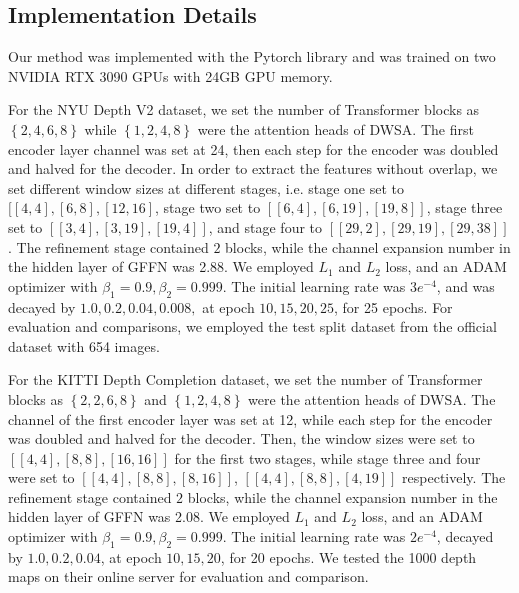 \documentclass[conference]{IEEEtran}
\begin{document}
\subsection{Implementation Details}
Our method was implemented with the Pytorch library and was trained on two NVIDIA RTX 3090 GPUs with 24GB GPU memory.

For the NYU Depth V2 dataset, we set the number of Transformer blocks as $\left\{ 2,4,6,8 \right\}$ while $\left\{ 1,2,4,8 \right\}$ were the attention heads of DWSA. The first encoder layer channel was set at 24, then each step for the encoder was doubled and halved for the decoder. In order to extract the features without overlap, we set different window sizes at different stages, i.e. stage one set to $[[4,4],[6,8],[12,16]$, stage two set to $[[6,4],[6,19],[19,8]]$, stage three set to $[[3,4],[3,19],[19,4]]$, and stage four to $[[29,2],[29,19],[29,38]]$. The refinement stage contained $2$ blocks, while the channel expansion number in the hidden layer of GFFN was 2.88. We employed  $L_1$ and $L_2$ loss, and an ADAM optimizer with $\beta_1 = 0.9,  \beta_2 = 0.999$. The initial learning rate was $3e^{- 4}$, and was decayed by ${1.0,0.2,0.04,0.008,}$ at epoch ${10,15,20,25}$, for 25 epochs. For evaluation and comparisons, we employed the test split dataset from the official dataset with 654 images.

For the KITTI Depth Completion dataset, we set the number of Transformer blocks as $\left\{ 2,2,6,8 \right\}$ and $\left\{ 1,2,4,8 \right\}$ were the attention heads of DWSA. The channel of the first encoder layer was set at 12, while each step for the encoder was doubled and halved for the decoder. Then, the window sizes were set to $[[4,4],[8,8],[16,16]]$ for the first two stages, while stage three and four were set to $[[4,4],[8,8],[8,16]]$, $[[4,4],[8,8],[4,19]]$ respectively. The refinement stage contained $2$ blocks, while the channel expansion number in the hidden layer of GFFN was 2.08. We employed  $L_1$ and $L_2$ loss, and an ADAM optimizer with $\beta_1 = 0.9,  \beta_2 = 0.999$. The initial learning rate was $2e^{- 4}$, decayed by ${1.0,0.2,0.04}$, at epoch ${10,15,20}$, for 20 epochs. We tested the 1000 depth maps on their online server for evaluation and comparison.
\end{document}

